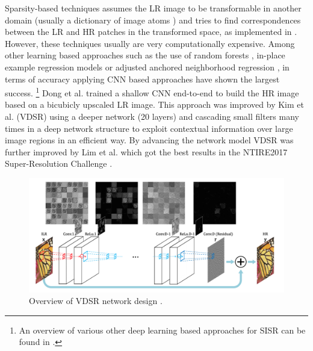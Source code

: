 Sparsity-based techniques assumes the \ac{LR} image to be transformable in another
domain (usually a dictionary of image atoms \cite{SARPFTTAISAIP}) and tries to
find correspondences between the \ac{LR} and \ac{HR} patches in the transformed space, as
implemented in \cite{IDASRBASDSAAR}. However, these techniques usually are
very computationally expensive. Among other learning based approaches such as
the use of random forests \cite{FAAIUWSRF}, in-place example regression models
\cite{FISRBOIPER} or adjusted anchored neighborhood regression \cite{AANRFFSR},
in terms of accuracy applying CNN based approaches have shown the largest success.
\footnote{An overview of various other deep learning based approaches for SISR
can be found in \cite{DLFSISRABR}.}
Dong et al. \cite{LADCNFISR} trained a shallow CNN end-to-end to build the HR
image based on a bicubicly upscaled LR image. This approach was improved by Kim
et al. \cite{AISRUVDCN} (VDSR) using a deeper network (20 layers) and cascading
small filters many times in a deep network structure to exploit contextual
information over large image regions in an efficient way. By advancing the
network model VDSR was further improved by Lim et al. \cite{EDRNFSISR} which
got the best results in the NTIRE2017 Super-Resolution Challenge \cite{NTIRE2017}.

\begin{figure}[!htbp]
	\centering
	\includegraphics[width=14cm]{figures/vdsr}
	\caption{Overview of VDSR network design \cite{AISRUVDCN}.}
  \label{fig:vdsr}
\end{figure}

